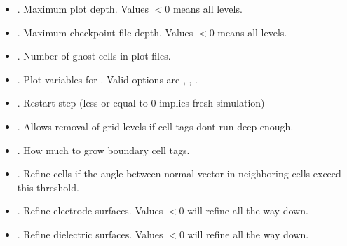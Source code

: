 \documentclass[letterpaper,10pt,english]{sphinxmanual}
\begin{document}
\begin{itemize}
\item {} 
\sphinxAtStartPar
{}. Maximum plot depth.
Values \(< 0\) means all levels.

\item {} 
\sphinxAtStartPar
{}.  Maximum checkpoint file depth.
Values \(< 0\) means all levels.

\item {} 
\sphinxAtStartPar
{}. Number of ghost cells in plot files.

\item {} 
\sphinxAtStartPar
{}. Plot variables for . Valid options are , , .

\item {} 
\sphinxAtStartPar
{}. Restart step (less or equal to 0 implies fresh simulation)

\item {} 
\sphinxAtStartPar
{}. Allows removal of grid levels if cell tags dont run deep enough.

\item {} 
\sphinxAtStartPar
{}. How much to grow boundary cell tags.

\item {} 
\sphinxAtStartPar
{}. Refine cells if the angle between normal vector in neighboring cells exceed this threshold.

\item {} 
\sphinxAtStartPar
{}. Refine electrode surfaces. Values \(< 0\) will refine all the way down.

\item {} 
\sphinxAtStartPar
{}. Refine dielectric surfaces. Values \(< 0\) will refine all the way down.

\end{itemize}
\end{document}

